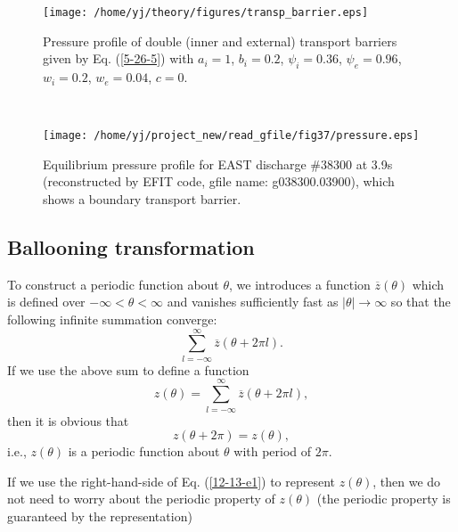 \documentclass{article}
\begin{document}
\begin{figure}[h]
  \texttt{[image: /home/yj/theory/figures/transp\_barrier.eps]}
  \caption{Pressure profile of double (inner and external) transport barriers
  given by Eq. (\ref{5-26-5}) with $a_i = 1$, $b_i = 0.2$, $\psi_i = 0.36$,
  $\psi_e = 0.96$, $w_i = 0.2$, $w_e = 0.04$, $c = 0$.}
\end{figure}

\

\begin{figure}[h]
  \texttt{[image: /home/yj/project\_new/read\_gfile/fig37/pressure.eps]}
  \caption{Equilibrium pressure profile for EAST discharge \#38300 at 3.9s
  (reconstructed by EFIT code, gfile name: g038300.03900), which shows a
  boundary transport barrier.}
\end{figure}

\subsection{Ballooning transformation}

To construct a periodic function about $\theta$, we introduces a function
$\overline{z} (\theta)$ which is defined over $- \infty < \theta < \infty$ and
vanishes sufficiently fast as $| \theta | \rightarrow \infty$ so that the
following infinite summation converge:
\begin{equation}
  \sum_{l = - \infty}^{\infty} \overline{z} (\theta + 2 \pi l) .
\end{equation}
If we use the above sum to define a function
\begin{equation}
  \label{12-13-e1} z (\theta) = \sum_{l = - \infty}^{\infty} \overline{z}
  (\theta + 2 \pi l),
\end{equation}
then it is obvious that
\begin{equation}
  z (\theta + 2 \pi) = z (\theta),
\end{equation}
i.e., $z (\theta)$ is a periodic function about $\theta$ with period of $2
\pi$.

If we use the right-hand-side of Eq. (\ref{12-13-e1}) to represent $z
(\theta)$, then we do not need to worry about the periodic property of $z
(\theta)$ (the periodic property is guaranteed by the representation)

\appendix\section{}
\end{document}
